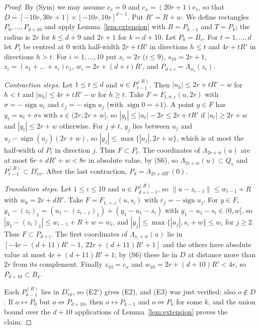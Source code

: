 \documentclass[11pt]{article}
\theoremstyle{definition}
\theoremstyle{remark}
\numberwithin{equation}{section}
\newcommand{\1}{\mathbf 1}
\newcommand{\lr}{\leftrightarrow}
\newcommand{\nlr}{\mathrel{\not\leftrightarrow}}
\newcommand{\Lam}{\Lambda}
\newcommand{\norm}[1]{\|#1\|}
\begin{document}
\begin{proof}
By (Sym) we may assume $c_v=0$ and $c_x=(20r+1)e_1$, so that
$D=[-10r,30r+1]\times[-10r,10r]^{d-1}$. Put $R'=R+w$. We define rectangles $P_0,\dots,P_{d+10}$ and
apply Lemma~\ref{lem:extension} with $B=P_{k-1}$ and $T=P_k$; the radius is $2r$ for $k\le d+9$
and $2r+1$ for $k=d+10$. Let $P_0=B_v$. For $t=1,\dots,d$ let $P_t$ be centred at $0$ with
half-width $2r+tR'$ in directions $h\le t$ and $4r+tR'$ in directions $h>t$. For $i=1,\dots,10$
put $s_i=2r$ ($i\le9$), $s_{10}=2r+1$, $z_i=(s_1+\dots+s_i)e_1$, $w_i=2r+(d+i)R'$, and
$P_{d+i}=\Lam_{w_i}(z_i)$.

\emph{Contraction steps.} Let $1\le t\le d$ and $u\in P_{t-1}^{(R)}$. Then $|u_h|\le2r+tR'-w$ for
$h<t$ and $|u_h|\le4r+tR'-w$ for $h\ge t$. Take $F=F_{t,\sigma,\varepsilon}(u,2r)$ with
$\sigma=-\operatorname{sign}u_t$ and $\varepsilon_j=-\operatorname{sign}u_j$ (with
$\operatorname{sign}0=+1$). A point $y\in F$ has $y_t=u_t+\sigma s$ with $s\in(2r,2r+w]$, so
$|y_t|\le|u_t|-2r\le2r+tR'$ if $|u_t|\ge2r+w$ and $|y_t|\le2r+w$ otherwise. For $j\ne t$, $y_j$ lies
between $u_j$ and $u_j-\operatorname{sign}(u_j)(2r+w)$, so $|y_j|\le\max\{|u_j|,2r+w\}$, which is at
most the half-width of $P_t$ in direction $j$. Thus $F\subset P_t$. The coordinates of
$\Lam_{2r+w}(u)$ are at most $6r+dR'+w<8r$ in absolute value, by (S6), so $\Lam_{2r+w}(u)\subset Q_v$
and $P_{t-1}^{(R)}\subset D^\circ_{vx}$. After the last contraction, $P_d=\Lam_{2r+dR'}(0)$.

\emph{Translation steps.} Let $1\le i\le10$ and $u\in P_{d+i-1}^{(R)}$, so
$\norm{u-z_{i-1}}\le w_{i-1}+R$ with $w_0=2r+dR'$. Take $F=F_{1,+,\varepsilon}(u,s_i)$ with
$\varepsilon_j=-\operatorname{sign}u_j$. For $y\in F$,
$y_1-(z_i)_1=(u_1-(z_{i-1})_1)+(y_1-u_1-s_i)$ with $y_1-u_1-s_i\in(0,w]$, so
$|y_1-(z_i)_1|\le w_{i-1}+R+w=w_i$, and $|y_j|\le\max\{|u_j|,s_i+w\}\le w_i$ for $j\ge2$. Thus
$F\subset P_{d+i}$. The first coordinates of $\Lam_{s_i+w}(u)$ lie in
$[-4r-(d+11)R'-1,\ 22r+(d+11)R'+1]$ and the others have absolute value at most $4r+(d+11)R'+1$; by
(S6) these lie in $D$ at distance more than $2r$ from its complement. Finally $z_{10}=c_x$ and
$w_{10}=2r+(d+10)R'<4r$, so $P_{d+10}\subset B_x$.

Each $P_{k-1}^{(R)}$ lies in $D^\circ_{vx}$, so (E2$^\circ$) gives (E2), and (E3) was just verified; also
$o\notin D$. If $o\lr P_0$ but $o\nlr P_{d+10}$, then $o\lr P_{k-1}$ and $o\nlr P_k$ for some $k$, and
the union bound over the $d+10$ applications of Lemma~\ref{lem:extension} proves the claim.
\end{proof}
\end{document}
